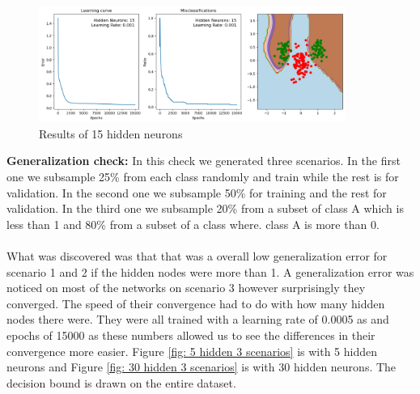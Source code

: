 \documentclass[a4paper]{article}
\begin{document}
\begin{figure}[htb]
    \centering
    \includegraphics[width=10cm]{Labs/Lab 1/Lab 1b/Figure/15HiddenLayer.png}
    \caption{Results of 15 hidden neurons}
    \label{fig:15Hidden}
\end{figure}
\textbf{Generalization check:}
In this check we generated three scenarios. In the first one we subsample 25\% from each class randomly and train while the rest is for validation. In the second one we subsample 50\% for training and the rest for validation. In the third one we subsample 20\% from a subset of class A which is less than 1 and 80\% from a subset of a class where. class A is more than 0. \\
\\ What was discovered was that that was a overall low generalization error for scenario 1 and 2 if the hidden nodes were more than 1. A generalization error was noticed on most of the networks on scenario 3 however surprisingly they converged. The speed of their convergence had to do with how many hidden nodes there were. They were all trained with a learning rate of 0.0005 as and epochs of 15000 as these numbers allowed us to see the differences in their convergence more easier. Figure \ref{fig: 5 hidden 3 scenarios} is with 5 hidden neurons and Figure \ref{fig: 30 hidden 3 scenarios} is with 30 hidden neurons. The decision bound is drawn on the entire dataset. 
\end{document}
